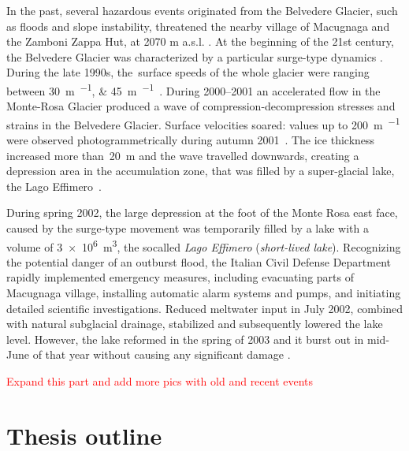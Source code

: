 In the past, several hazardous events originated from the Belvedere Glacier, such as floods
and slope instability, threatened the nearby village of Macugnaga and the Zamboni Zappa
Hut, at 2070 m a.s.l. \citep{Kaab2004}.
At the beginning of the 21st century, the Belvedere Glacier was characterized by a
particular surge-type dynamics  \citep{Haeberli2002}.
During the late 1990s, the~surface speeds of the whole glacier were ranging between
\SIlist{30;45}{\meter\per\year}~\citep{Roethlisberger1985, Kaab2005}.
During 2000--2001 an accelerated flow in the Monte-Rosa Glacier produced a wave of
compression-decompression stresses and strains in the Belvedere Glacier.
Surface velocities soared: values up to \SI{200}{\meter\per\year} were observed
photogrammetrically during autumn 2001~\citep{Kaab2004}.
The ice thickness increased more than~\SI{20}{\meter} and the wave travelled downwards,
creating a depression area in the accumulation zone, that was filled by a super-glacial
lake, the Lago Effimero~\citep{Haeberli2002, Mortara2009}.

During spring 2002, the large depression at the foot of the Monte Rosa east face, caused by the 
surge-type movement was temporarily filled by a lake with a volume of \SI{3e6}{\cubic\meter}, 
the socalled \textit{Lago Effimero} (\textit{short-lived lake}).
Recognizing the potential danger of an outburst flood, the Italian Civil Defense Department rapidly 
implemented emergency measures, including evacuating parts of Macugnaga village, installing automatic 
alarm systems and pumps, and initiating detailed scientific investigations. 
Reduced meltwater input in July 2002, combined with natural subglacial drainage, stabilized and subsequently 
lowered the lake level.
However, the lake reformed in the spring of 2003 and it burst out in mid-June of that year without causing 
any significant damage \citep{Kaab2004}.

\textcolor{red}{Expand this part and add more pics with old and recent events}


\section{Thesis outline}

\makechapterbibliography{}